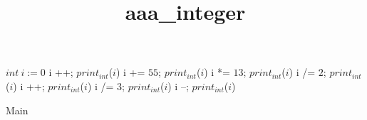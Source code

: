 \documentclass[8pt]{article}
\title{aaa\_integer}
\begin{document}
\maketitle


\begin{algorithm}[H]
$int\:i := 0$\;
i ++;
$print_{int}$($ i $)\;
i += $ 55 $;
$print_{int}$($ i $)\;
i *= $ 13 $;
$print_{int}$($ i $)\;
i /= $ 2 $;
$print_{int}$($ i $)\;
i ++;
$print_{int}$($ i $)\;
i /= $ 3 $;
$print_{int}$($ i $)\;
i --;
$print_{int}$($ i $)\;
\caption{Main}
\end{algorithm}
\end{document}
